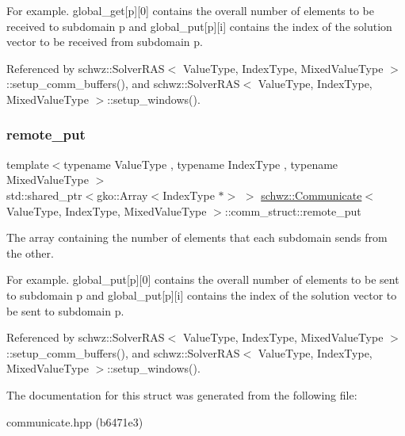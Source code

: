 For example. global\+\_\+get\mbox{[}p\mbox{]}\mbox{[}0\mbox{]} contains the overall number of elements to be received to subdomain p and global\+\_\+put\mbox{[}p\mbox{]}\mbox{[}i\mbox{]} contains the index of the solution vector to be received from subdomain p. 

Referenced by schwz\+::\+Solver\+R\+A\+S$<$ Value\+Type, Index\+Type, Mixed\+Value\+Type $>$\+::setup\+\_\+comm\+\_\+buffers(), and schwz\+::\+Solver\+R\+A\+S$<$ Value\+Type, Index\+Type, Mixed\+Value\+Type $>$\+::setup\+\_\+windows().

\mbox{\label{structschwz_1_1Communicate_1_1comm__struct_a206d13b093699bf04bd1efb51c4290f2}} 
\subsubsection{\texorpdfstring{remote\+\_\+put}{remote\_put}}
{\footnotesize\ttfamily template$<$typename Value\+Type , typename Index\+Type , typename Mixed\+Value\+Type $>$ \\
std\+::shared\+\_\+ptr$<$gko\+::\+Array$<$Index\+Type $\ast$$>$ $>$ \hyperlink{classschwz_1_1Communicate}{schwz\+::\+Communicate}$<$ Value\+Type, Index\+Type, Mixed\+Value\+Type $>$\+::comm\+\_\+struct\+::remote\+\_\+put}



The array containing the number of elements that each subdomain sends from the other. 

For example. global\+\_\+put\mbox{[}p\mbox{]}\mbox{[}0\mbox{]} contains the overall number of elements to be sent to subdomain p and global\+\_\+put\mbox{[}p\mbox{]}\mbox{[}i\mbox{]} contains the index of the solution vector to be sent to subdomain p. 

Referenced by schwz\+::\+Solver\+R\+A\+S$<$ Value\+Type, Index\+Type, Mixed\+Value\+Type $>$\+::setup\+\_\+comm\+\_\+buffers(), and schwz\+::\+Solver\+R\+A\+S$<$ Value\+Type, Index\+Type, Mixed\+Value\+Type $>$\+::setup\+\_\+windows().



The documentation for this struct was generated from the following file\+:\begin{DoxyCompactItemize}
\item 
communicate.\+hpp (b6471e3)\end{DoxyCompactItemize}
